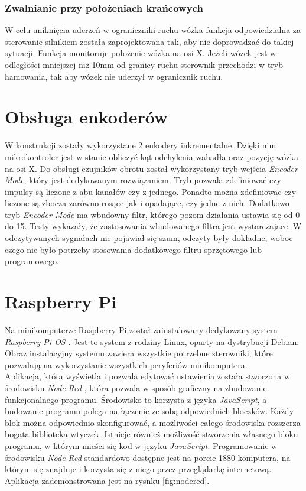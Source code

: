 \subsubsection{Zwalnianie przy położeniach krańcowych}
W celu uniknięcia uderzeń w ograniczniki ruchu wózka funkcja odpowiedzialna za sterowanie silnikiem została zaprojektowana tak, aby nie doprowadzać do takiej sytuacji. Funkcja monitoruje położenie wózka na osi X. Jeżeli wózek jest w odległości mniejszej niż 10mm od granicy ruchu sterownik przechodzi w tryb hamowania, tak aby wózek nie uderzył w ogranicznik ruchu.

\section{Obsługa enkoderów}
W konstrukcji zostały wykorzystane 2 enkodery inkrementalne. Dzięki nim mikrokontroler jest w stanie obliczyć kąt odchylenia wahadła oraz pozycję wózka na osi X. Do obsługi czujników obrotu został wykorzystany tryb wejścia \textit{Encoder Mode}, który jest dedykowanym rozwiązaniem. Tryb pozwala zdefiniować czy impulsy są liczone z abu kanałów czy z jednego. Ponadto można zdefiniowac czy liczone są zbocza zarówno rosące jak i opadające, czy jedne z nich. Dodatkowo tryb \textit{Encoder Mode} ma wbudowny filtr, którego pozom działania ustawia się od 0 do 15. Testy wykazały, że zastosowania wbudowanego filtra jest wystarczajace. W odczytywanych sygnałach nie pojawiał się szum, odczyty były dokładne, woboc czego nie było potrzeby stosowania dodatkowego filtru sprzętowego lub programowego. 


\section{Raspberry Pi}
Na minikomputerze Raspberry Pi został zainstalowany dedykowany system \textit{Raspberry Pi OS} \cite{raspbian}. Jest to system z rodziny Linux, oparty na dystrybucji Debian. Obraz instalacyjny systemu zawiera wszystkie potrzebne sterowniki, które pozwalają na wykorzystanie wszystkich peryferiów minikomputera.\\
Aplikacja, która wyświetla i pozwala edytować ustawienia została stworzona w środowisku \textit{Node-Red} \cite{nodered}, która pozwala w sposób graficzny na zbudowanie funkcjonalnego programu. Środowisko to korzysta z języka \textit{JavaScript}, a budowanie programu polega na łączenie ze sobą odpowiednich bloczków. Każdy blok można odpowiednio skonfigurować, a możliwości całego środowiska rozszerza bogata biblioteka wtyczek. Istnieje również możliwość stworzenia własnego bloku programu, w którym mieści się kod w języku \textit{JavaScript}. Programowanie w środowisku \textit{Node-Red} standardowo dostępne jest na porcie 1880 komputera, na którym się znajduje i korzysta się z niego przez przeglądarkę internetową. Aplikacja zademonstrowana jest na rysnku \ref{fig:nodered}.

